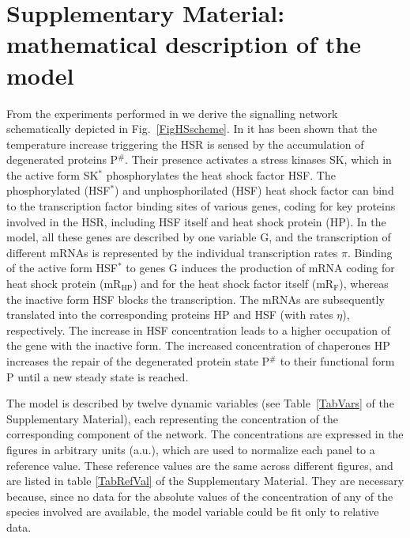 \documentclass[oneside, 10pt, a4paper, twocolumn]{article}
\begin{document}
\clearpage


\appendix

\section{Supplementary Material: mathematical description of the model}
\label{Tables}

From the experiments performed in \cite{Schmollinger2013} we derive
the signalling network schematically depicted in Fig.~\ref{FigHSscheme}. %
In
\cite{Schmollinger2013} it has been shown that the temperature
increase triggering the HSR is sensed by the accumulation of
degenerated proteins P$^\#$. Their presence activates a stress
kinases SK, which in the active form SK$^*$ phosphorylates the heat
shock factor HSF. The phosphorylated (HSF$^*$) and unphosphorilated
(HSF) heat shock factor can bind to the transcription factor binding
sites of various genes, coding for key proteins involved in the HSR,
including HSF itself and heat shock protein (HP). In the model, all these genes are
described by one variable G, and the transcription of different mRNAs
is represented by the individual transcription rates $\pi$. Binding
of the active form HSF$^*$ to genes G induces the production of mRNA
coding for heat shock protein (mR$_{\text{HP}}$) and for the heat
shock factor itself (mR$_{\text{F}}$), whereas the inactive form HSF
blocks the transcription. The mRNAs are subsequently translated into
the corresponding proteins HP and HSF (with rates $\eta$),
respectively. The increase in HSF concentration leads to a higher
occupation of the gene with the inactive form. The increased
concentration of chaperones HP increases the repair of the
degenerated protein state P$^\#$ to their functional form P until a new
steady state is reached.

The model is described by twelve dynamic variables (see Table~\ref{TabVars} of the Supplementary Material), 
each representing the concentration of the corresponding component of the network. 
The concentrations are expressed in the figures in arbitrary units (a.u.), which are used to normalize each panel to a reference value. These reference values are the same across different figures, and are listed in table \ref{TabRefVal} of the Supplementary Material. They are necessary because, since no data for the absolute values of the concentration of any of the species involved are available, the model variable could be fit only to relative data.
\end{document}
